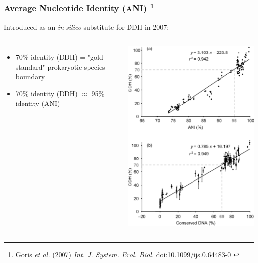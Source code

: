 %
\begin{frame}
  \frametitle{Average Nucleotide Identity (ANI)
  \footnote{\tiny{\href{http://dx.doi.org/10.1099/ijs.0.64483-0
}{Goris \textit{et al.} (2007) \textit{Int. J. System. Evol. Biol.} doi:10.1099/ijs.0.64483-0
}}}
  }
  Introduced as an \textit{in silico} substitute for DDH in 2007:
  \begin{columns}[T] 
      \begin{itemize}
        \item \textcolor{hutton_green}{70\% identity (DDH) = "gold standard" prokaryotic species boundary}
        \item \textcolor{hutton_blue}{70\% identity (DDH) $\approx$ 95\% identity (ANI)}
      \end{itemize}
      \includegraphics[width=\textwidth]{images/ani_ddh_equiv}
  \end{columns}    
\end{frame}

